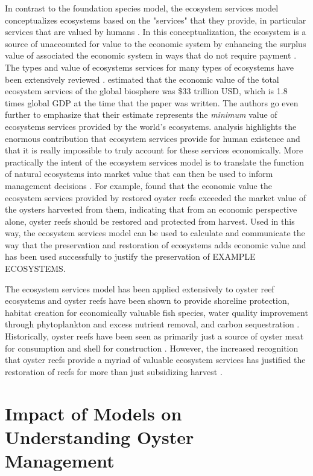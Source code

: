\documentclass{article}
\begin{document}

In contrast to the foundation species model, the ecosystem services model conceptualizes ecosystems based on the "services" that they provide, in particular services that are valued by humans \cite{}. In this conceptualization, the ecosystem is a source of unaccounted for value to the economic system by enhancing the surplus value of associated the economic system in ways that do not require payment \cite{}. The types and value of ecosystems services for many types of ecosystems have been extensively reviewed \cite{costanza_value_1998, }.  estimated that the economic value of the total ecosystem services of the global biosphere was \$33 trillion USD, which is 1.8 times global GDP at the time that the paper was written. The authors go even further to emphasize that their estimate represents the \emph{minimum} value of ecosystems services provided by the world's ecosystems.  analysis highlights the enormous contribution that ecosystem services provide for human existence and that it is really impossible to truly account for these services economically. 
More practically the intent of the ecosystem services model is to translate the function of natural ecosystems into market value that can then be used to inform management decisions \cite{}. For example,  found that the economic value the ecosystem services provided by restored oyster reefs exceeded the market value of the oysters harvested from them, indicating that from an economic perspective alone, oyster reefs should be restored and protected from harvest. Used in this way, the ecosystem services model can be used to calculate and communicate the way that the preservation and restoration of ecosystems adds economic value \cite{} and has been used successfully to justify the preservation of EXAMPLE ECOSYSTEMS. 

The ecosystem services model has been applied extensively to oyster reef ecosystems and oyster reefs have been shown to provide shoreline protection, habitat creation for economically valuable fish species, water quality improvement through phytoplankton and excess nutrient removal, and carbon sequestration  \cite{coen_ecosystem_2007, grabowski_economic_2012, }. Historically, oyster reefs have been seen as primarily just a source of oyster meat for consumption and shell for construction \cite{}. However, the increased recognition that oyster reefs provide a myriad of valuable ecosystem services has justified the restoration of reefs for more than just subsidizing harvest \cite{}. 

\section{Impact of Models on Understanding Oyster Management}



\end{document}
